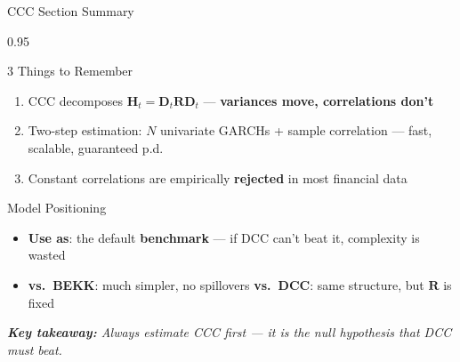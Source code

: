 \documentclass[9pt, aspectratio=169, t]{beamer}
\begin{document}
\begin{frame}{CCC Section Summary}
    \begin{cminipage}{0.95\textwidth}
    {\footnotesize
    \begin{block}{3 Things to Remember}
        \begin{enumerate}\setlength{\itemsep}{2pt}
            \item CCC decomposes $\mathbf{H}_t = \mathbf{D}_t\mathbf{R}\mathbf{D}_t$ --- \textbf{variances move, correlations don't}
            \item Two-step estimation: $N$ univariate GARCHs + sample correlation --- fast, scalable, guaranteed p.d.
            \item Constant correlations are empirically \textbf{rejected} in most financial data
        \end{enumerate}
    \end{block}
    \begin{alertblock}{Model Positioning}
        \begin{itemize}\setlength{\itemsep}{0pt}
            \item \textbf{Use as}: the default \textbf{benchmark} --- if DCC can't beat it, complexity is wasted
            \item \textbf{vs.\ BEKK}: much simpler, no spillovers \quad \textbf{vs.\ DCC}: same structure, but $\mathbf{R}$ is fixed
        \end{itemize}
    \end{alertblock}
    \vspace{1mm}
    \textit{\textbf{Key takeaway:} Always estimate CCC first --- it is the null hypothesis that DCC must beat.}
    }
    \end{cminipage}
\end{frame}

\end{document}
